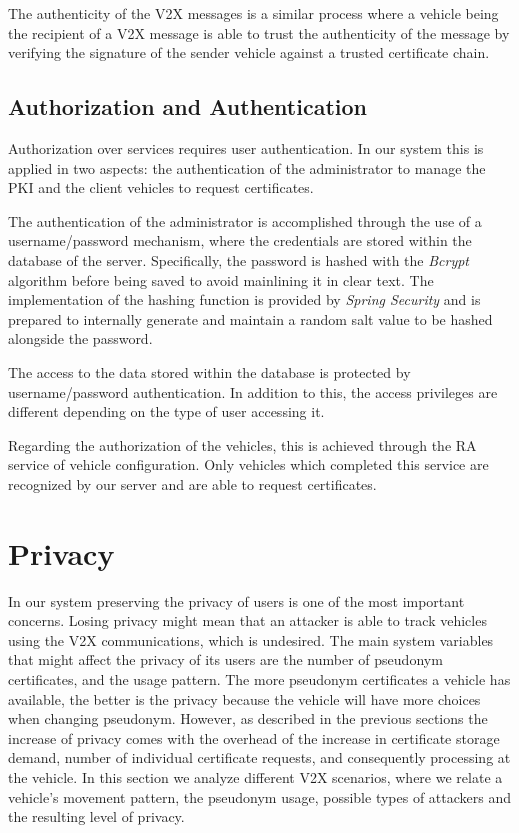 		The authenticity of the V2X messages is a similar process where a vehicle being the recipient of a V2X message is able to trust the authenticity of the message by verifying the signature of the sender vehicle against a trusted certificate chain. 
		
		\subsection{Authorization and Authentication}
		Authorization over services requires user authentication. In our system this is applied in two aspects: the authentication of the administrator to manage the PKI and the client vehicles to request certificates. 
		
		The authentication of the administrator is accomplished through the use of a username/password mechanism, where the credentials are stored within the database of the server. Specifically, the password is hashed with the \textit{Bcrypt} algorithm before being saved to avoid mainlining it in clear text. The implementation of the hashing function is provided by \textit{Spring Security} and is prepared to internally generate and maintain a random salt value to be hashed alongside the password.
		
		The access to the data stored within the database is protected by username/password authentication. In addition to this, the access privileges are different depending on the type of user accessing it.
		
		Regarding the authorization of the vehicles, this is achieved through the RA service of vehicle configuration. Only vehicles which completed this service are recognized by our server and are able to request certificates.
		
		
		\section{Privacy}
		In our system preserving the privacy of users is one of the most important concerns. Losing privacy might mean that an attacker is able to track vehicles using the V2X communications, which is undesired. The main system variables that might affect the privacy of its users are the number of pseudonym certificates, and the usage pattern. The more pseudonym certificates a vehicle has available, the better is the privacy because the vehicle will have more choices when changing pseudonym. However, as described in the previous sections the increase of privacy comes with the overhead of the increase in certificate storage demand, number of individual certificate requests, and consequently processing at the vehicle. In this section we analyze different V2X scenarios, where we relate a vehicle's movement pattern, the pseudonym usage, possible types of attackers and the resulting level of privacy.
		
